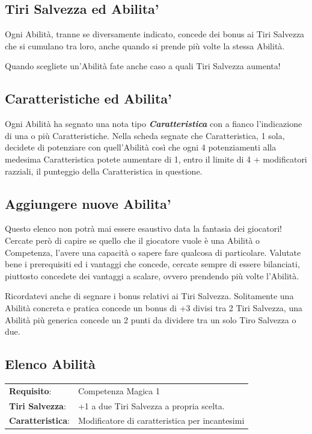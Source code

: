 \begin{multicols}{2}
\subsection{Tiri Salvezza ed Abilita'}\label{tirisalvezzaedabilita}

Ogni Abilità, tranne se diversamente indicato, concede dei bonus ai Tiri Salvezza che si cumulano tra loro, anche quando si prende più volte la stessa Abilità.

Quando scegliete un'Abilità fate anche caso a quali Tiri Salvezza aumenta!

\subsection{Caratteristiche ed Abilita'}\label{caratteristicheedabilita}

Ogni Abilità ha segnato una nota tipo \emph{\textbf{Caratteristica}} con a fianco l'indicazione di una o più Caratteristiche. Nella scheda segnate che Caratteristica, 1 sola, decidete di potenziare con quell'Abilità così che ogni 4 potenziamenti alla medesima Caratteristica potete aumentare di 1, entro il limite di 4 + modificatori razziali, il punteggio della Caratteristica in questione.

\subsection{Aggiungere nuove Abilita'}\label{aggiungereabilita}

Questo elenco non potrà mai essere esaustivo data la fantasia dei giocatori! Cercate però di capire se quello che il giocatore vuole è una Abilità o Competenza, l'avere una capacità o sapere fare qualcosa di particolare.
Valutate bene i prerequisiti ed i vantaggi che concede, cercate sempre di essere bilanciati, piuttosto concedete dei vantaggi a scalare, ovvero prendendo più volte l'Abilità.

Ricordatevi anche di segnare i bonus relativi ai Tiri Salvezza. Solitamente una Abilità concreta e pratica concede un bonus di +3 divisi tra 2 Tiri Salvezza, una Abilità più generica concede un 2 punti da dividere tra un solo Tiro Salvezza o due.

\subsection{Elenco Abilità}

\noindent\begin{tabularx}{\linewidth}{>{\raggedright\arraybackslash}p{2.5cm}X}
\rowcolor{gray!20}\textbf{Requisito}: & Competenza Magica 1\\
\textbf{Tiri Salvezza}: & +1 a due Tiri Salvezza a propria scelta.\\
\rowcolor{gray!20}\textbf{Caratteristica}: & Modificatore di caratteristica per incantesimi\\
\end{tabularx}\smallskip


\end{multicols}
